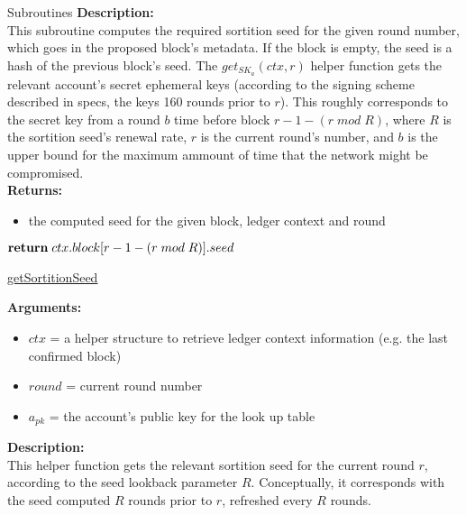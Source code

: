\documentclass[10pt,a4paper]{article}
\begin{document}
\begin{section}{Subroutines}
\noindent \textbf{Description:}\\
This subroutine computes the required sortition seed for the given round number, 
which goes in the proposed block's metadata.
If the block is empty, the seed is a hash of the previous block's seed.
The $get_{SK_a}(ctx, r)$ helper function gets the relevant account's secret ephemeral keys (according to the signing scheme described in specs, the keys 160 rounds prior to $r$).
This roughly corresponds to the secret key from a round $b$ time before block $r-1-(r\;mod\;R)$, where $R$ is the sortition seed's renewal rate, $r$ is the current round's number,
and $b$ is the upper bound for the maximum ammount of time that the network might be compromised.\\

\noindent \textbf{Returns:}
\begin{itemize}
    \item the computed seed for the given block, ledger context and round
  \end{itemize}


\begin{algorithm}[H]
    \begin{algorithmic}[1]
        
            $\Return\;ctx.block[r-1-(r\;mod\;R)].seed$

        \EndFunction
    \end{algorithmic}
    \caption{\underline{getSortitionSeed}}
\end{algorithm}

\noindent \textbf{Arguments:}
\begin{itemize}
    \item $ctx$ = a helper structure to retrieve ledger context information (e.g. the last confirmed block)
    \item $round$ = current round number
    \item $a_{pk}$ = the account's public key for the look up table
  \end{itemize}


\noindent \textbf{Description:}\\
This helper function gets the relevant sortition seed for the current round $r$, according to the seed lookback parameter $R$.
Conceptually, it corresponds with the seed computed $R$ rounds prior to $r$, refreshed every $R$ rounds.


\end{section}
\end{document}
